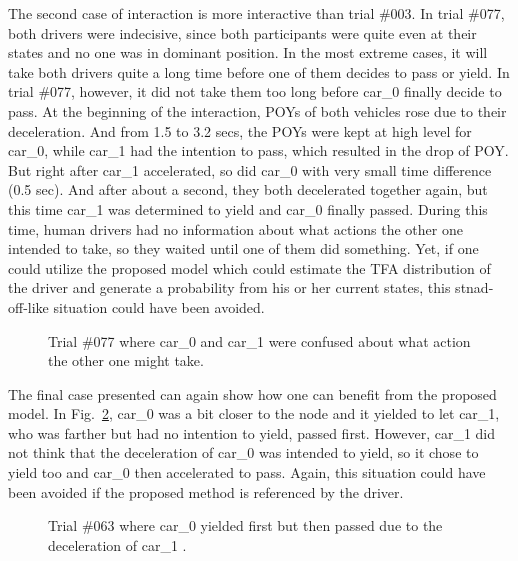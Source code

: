 The second case of interaction is more interactive than trial \#003. In trial \#077, both drivers were indecisive, since both participants were quite even at their states and no one was in dominant position. In the most extreme cases, it will take both drivers quite a long time before one of them decides to pass or yield. In trial \#077, however, it did not take them too long before car\_0 finally decide to pass. At the beginning of the interaction, POYs of both vehicles rose due to their deceleration. And from 1.5 to 3.2 secs, the POYs were kept at high level for car\_0, while car\_1 had the intention to pass, which resulted in the drop of POY. But right after car\_1 accelerated, so did car\_0 with very small time difference (0.5 sec). And after about a second, they both decelerated together again, but this time car\_1 was determined to yield and car\_0 finally passed. During this time, human drivers had no information about what actions the other one intended to take, so they waited until one of them did something. Yet, if one could utilize the proposed model which could estimate the TFA distribution of the driver and generate a probability from his or her current states, this stnad-off-like situation could have been avoided. 

\begin{figure}[htbp!]
\begin{center}
\end{center}
\caption{Trial \#077 where car\_0 and car\_1 were confused about what action the other one might take.}
\label{fig:trial077} 
\end{figure}


The final case presented can again show how one can benefit from the proposed model. In Fig.~\ref{fig:trial063}, car\_0 was a bit closer to the node and it yielded to let car\_1, who was farther but had no intention to yield, passed first. However, car\_1 did not think that the deceleration of car\_0 was intended to yield, so it chose to yield too and car\_0 then accelerated to pass. Again, this situation could have been avoided if the proposed method is referenced by the driver.


\begin{figure}[htbp!]
\begin{center}
\end{center}
\caption{Trial \#063 where car\_0 yielded first but then passed due to the deceleration of car\_1 .}
\label{fig:trial063} 
\end{figure}

